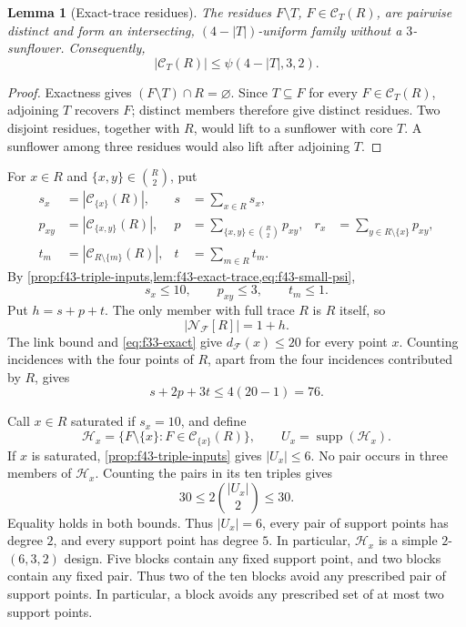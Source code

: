 \documentclass[11pt]{article}
\numberwithin{equation}{section}
\newtheorem{lemma}[lemma]{Lemma}
\theoremstyle{definition}
\theoremstyle{remark}
\newcommand{\F}{\mathcal F}
\newcommand{\C}{\mathcal C}
\newcommand{\Hh}{\mathcal H}
\newcommand{\supp}{\operatorname{supp}}
\begin{document}
\begin{lemma}[Exact-trace residues]
\label{lem:f43-exact-trace}
The residues $F\setminus T$, $F\in\C_T(R)$, are pairwise distinct and form
an intersecting, $(4-|T|)$-uniform family without a $3$-sunflower. Consequently,
\begin{equation}
 |\C_T(R)|\le\psi(4-|T|,3,2).
 \label{eq:f43-trace-cap}
\end{equation}
\end{lemma}

\begin{proof}
Exactness gives $(F\setminus T)\cap R=\varnothing$. Since $T\subseteq F$
for every $F\in\C_T(R)$, adjoining $T$ recovers $F$; distinct members
therefore give distinct residues. Two disjoint residues, together with $R$,
would lift to a sunflower with core $T$. A sunflower among three residues
would also lift after adjoining $T$.
\end{proof}

For $x\in R$ and $\{x,y\}\in\binom R2$, put
\begin{align*}
 s_x&=|\C_{\{x\}}(R)|,&s&=\sum_{x\in R}s_x,\\
 p_{xy}&=|\C_{\{x,y\}}(R)|,&
 p&=\sum_{\{x,y\}\in\binom R2}p_{xy},&
 r_x&=\sum_{y\in R\setminus\{x\}}p_{xy},\\
 t_m&=|\C_{R\setminus\{m\}}(R)|,&t&=\sum_{m\in R}t_m.
\end{align*}
By \cref{prop:f43-triple-inputs,lem:f43-exact-trace,eq:f43-small-psi},
\begin{equation}
 s_x\le10,
 \qquad p_{xy}\le3,
 \qquad t_m\le1.
 \label{eq:f43-initial-traces}
\end{equation}
Put $h=s+p+t$. The only member with full trace $R$ is $R$ itself, so
\begin{equation}
 |\mathcal N_{\F}[R]|=1+h.
 \label{eq:f43-neighborhood-h}
\end{equation}
The link bound and \cref{eq:f33-exact} give $d_{\F}(x)\le20$ for every
point $x$. Counting incidences with the four points of $R$, apart from the
four incidences contributed by $R$, gives
\begin{equation}
 s+2p+3t\le4(20-1)=76.
 \label{eq:f43-incidence}
\end{equation}

Call $x\in R$ saturated if $s_x=10$, and define
\[
 \Hh_x=\{F\setminus\{x\}:F\in\C_{\{x\}}(R)\},
 \qquad U_x=\supp(\Hh_x).
\]
If $x$ is saturated, \cref{prop:f43-triple-inputs} gives $|U_x|\le6$.
No pair occurs in three members of $\Hh_x$. Counting the pairs in its ten
triples gives
\[
 30\le2\binom{|U_x|}{2}\le30.
\]
Equality holds in both bounds. Thus $|U_x|=6$, every pair of support points has
degree $2$, and every support point has degree $5$. In particular,
$\Hh_x$ is a simple $2$-$(6,3,2)$ design. Five blocks contain any fixed
support point, and two blocks contain any fixed pair. Thus two of the ten
blocks avoid any prescribed pair of support points. In particular, a block
avoids any prescribed set of at most two support points.
\end{document}
